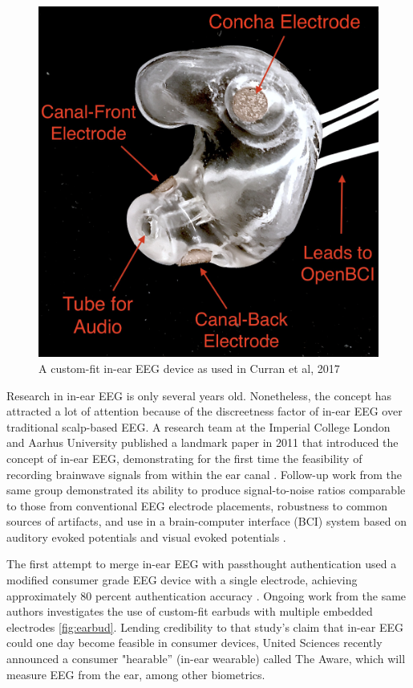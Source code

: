 \documentclass[sigconf]{acmart}
\begin{document}
\label{fig:earbud}
\begin{figure}[t!]
\centering
\includegraphics[width=.9\linewidth]{./figures/custom-fit-eeg-annotated.jpg}
\caption{A custom-fit in-ear EEG device as used in Curran et al, 2017}
\end{figure}

Research in in-ear EEG is only several years old. Nonetheless, the concept has
attracted a lot of attention because of the discreetness factor of in-ear EEG over
traditional scalp-based EEG. A research team at the Imperial College London
and Aarhus University published a landmark paper in 2011 that introduced the
concept of in-ear EEG, demonstrating for the first time the feasibility of recording
brainwave signals from within the ear canal
\cite{Looney2011}.
Follow-up work from the same
group demonstrated its ability to produce signal-to-noise ratios comparable to
those from conventional EEG electrode placements, robustness to common
sources of artifacts, and use in a brain-computer interface (BCI) system based on
auditory evoked potentials and visual evoked potentials
\cite{Looney2012a,Kidmose2013a,Kidmose2013b}.

The first attempt to merge in-ear EEG with passthought authentication
used a modified consumer grade EEG device with a single electrode, achieving approximately 80 percent authentication accuracy \cite{curranpassthoughts}.
Ongoing work from the same authors investigates the use of custom-fit earbuds with multiple embedded electrodes \ref{fig:earbud}.
Lending credibility to that study's claim that in-ear EEG could one day become feasible in consumer devices,
United Sciences recently announced a consumer "hearable'' (in-ear wearable) called The Aware, which will measure EEG from the ear, among other biometrics.
\end{document}
